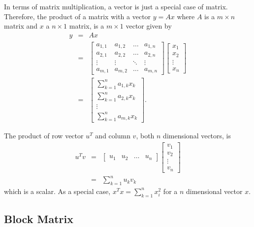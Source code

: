 In terms of matrix multiplication, a vector is just a special case of matrix. Therefore, the product of a matrix with a vector $y=Ax$ where $A$ is a $m\times n$ matrix and $x$ a $n\times 1$ matrix, is a $m\times 1$ vector given by
\begin{eqnarray}
    y &=& Ax \nonumber \\
    &=& \left[\begin{array}{cccc}
        a_{1,1} & a_{1,2} & \ldots & a_{1,n} \\
        a_{2,1} & a_{2,2} & \ldots & a_{2,n} \\
        \vdots & \vdots & \ddots & \vdots \\
        a_{m,1} & a_{m,2} & \ldots & a_{m,n}
    \end{array}\right] \left[\begin{array}{cc}
         x_1  \\
         x_2 \\
         \vdots \\
         x_n
    \end{array}\right] \nonumber \\
    &=& \left[\begin{array}{c}
         \sum_{k=1}^n a_{1,k}x_k \\
         \sum_{k=1}^n a_{2,k}x_k \\
         \vdots \\
         \sum_{k=1}^n a_{m,k}x_k
    \end{array}\right]. \nonumber
\end{eqnarray}

The product of row vector $u^T$ and column $v$, both $n$ dimensional vectors, is
\begin{eqnarray}
    u^Tv &=& \left[\begin{array}{cccc} u_1 & u_2 & \ldots & u_n
    \end{array}\right] \left[\begin{array}{cc}
         v_1  \\
         v_2 \\
         \vdots \\
         v_n
    \end{array}\right] \nonumber \\
    &=& \sum_{k=1}^n u_kv_k \nonumber
\end{eqnarray}
which is a scalar. As a special case, $x^Tx = \sum_{k=1}^n x_i^2$ for a $n$ dimensional vector $x$.

\subsection{Block Matrix}

